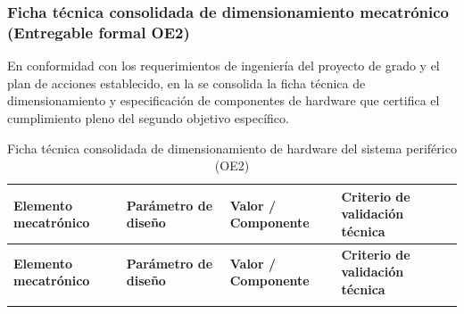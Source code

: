 \subsubsection{Ficha técnica consolidada de dimensionamiento mecatrónico (Entregable formal OE2)}
\label{subsubsec:ficha_tecnica_oe2}

En conformidad con los requerimientos de ingeniería del proyecto de grado y el plan de acciones establecido, en la  se consolida la ficha técnica de dimensionamiento y especificación de componentes de hardware que certifica el cumplimiento pleno del segundo objetivo específico.

{\setlength{\parskip}{1.5pt}
\setlength{\tabcolsep}{3.0pt}
\begin{longtable}{L{2.5cm}L{2.9cm}L{3.3cm}L{4.5cm}}
\caption{Ficha técnica consolidada de dimensionamiento de hardware del sistema periférico (OE2)}
\label{tab:ficha_tecnica_dimensionamiento_oe2}
\\
\hline
\textbf{Elemento mecatrónico} & \textbf{Parámetro de diseño} & \textbf{Valor / Componente} & \textbf{Criterio de validación técnica} \\
\hline \hline
\endfirsthead

\hline
\textbf{Elemento mecatrónico} & \textbf{Parámetro de diseño} & \textbf{Valor / Componente} & \textbf{Criterio de validación técnica} \\
\hline \hline
\endhead

\hline
\endfoot

\endlastfoot


\end{longtable}}
